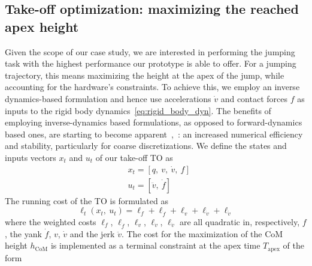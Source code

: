\subsection{Take-off optimization: maximizing the reached apex height}\label{subsec:takeoff_opt}
Given the scope of our case study, we are interested in performing the jumping task with the highest performance our prototype is able to offer. For a jumping trajectory, this means maximizing the height at the apex of the jump, while accounting for the hardware's constraints. To achieve this, we employ an inverse dynamics-based formulation and hence use accelerations $\dot{v}$ and contact forces $f$ as inputs to the rigid body dynamics~\eqref{eq:rigid_body_dyn}. The benefits of employing inverse-dynamics based formulations, as opposed to forward-dynamics based ones, are starting to become apparent~\cite{to::ferrolho2021inverse},~\cite{to::mastalli2022inverse}: an increased numerical efficiency and stability, particularly for coarse discretizations. We define the states and inputs vectors $x_t$ and $u_t$ of  our take-off TO as
\begin{eqnarray}
&x_t = \left[q,~v,~\dot{v},~f\right]\label{eq:states_takeoff_opt}\\
&u_t = \left[\ddot{v},~\dot{f}\right]\label{eq:inputs_takeoff_opt}
\end{eqnarray}
The running cost of the TO is formulated as
\begin{dmath}\label{eq:takeoff_running_cost}
    \ell_{t}(x_t,~u_t) = \ell_f + \ell_{\dot{f}} + \ell_{v} +  \ell_{\dot{v}} + \ell_{\ddot{v}}
\end{dmath}
where the weighted costs $\ell_{f}$, $\ell_{\dot{f}}$, $\ell_{v}$, $\ell_{\dot{v}}$, $\ell_{\ddot{v}}$ are all quadratic in, respectively, $f$, the yank $\dot{f}$, $v$, $\dot{v}$ and the jerk $\ddot{v}$. 
The cost for the maximization of the CoM height $h_{\mathrm{CoM}}$ is implemented as a terminal constraint at the apex time $T_{\mathrm{apex}}$ of the form 
